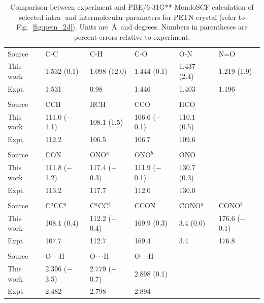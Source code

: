 \documentclass[prb,aps,nobibnotes,twocolumn,doublespace,twocolumngrid,superbib]{revtex4}
\begin{document}
\begin{table}[p]
\caption{Comparison between experiment and PBE/6-31G** MondoSCF calculation
of selected intra- and intermolecular parameters for
PETN crystal (refer to Fig.~\ref{fig:petn_2d}).  
Units are~\AA\ and degrees.  Numbers in parentheses
are percent errors relative to experiment.}
\begin{center}
\begin{tabular}{llllll}
\hline\hline
Source & C-C & C-H & C-O & O-N & N=O  \\
This work & 1.532 (0.1) & 1.098 (12.0) & 1.444 (0.1) &  1.437 (2.4) & 1.219 (1.9) \\
Expt.~\cite{Conant_1979} &  1.531   &   0.98  & 1.446  &  1.403 &   1.196 \\
\hline
\\
Source  &  CCH   &        HCH     &      CCO    &       HCO \\
This work & 111.0 ($-$1.1)  & 108.1  (1.5) &  106.6 ($-$0.1) & 110.1 (0.5) \\
Expt.~\cite{Conant_1979} &  112.2    &  106.5  &  106.7   & 109.6 \\
\hline
\\
Source   &  CON     &       ONO$^a$   &        ONO$^b$     &      ONO \\
This work&  111.8 ($-$1.2) &  117.4 ($-$0.3)&  111.9 ($-$0.1)&  130.7 (0.3)\\
Expt.~\cite{Conant_1979} &    113.2   &       117.7   &       112.0   &       130.0\\
\hline\\
Source &    C$^a$CC$^a$ & C$^a$CC$^b$ & CCON    &       CONO$^a$   &       CONO$^b$ \\
This work &  108.1 (0.4) & 112.2 ($-$0.4)&  169.9 (0.3) &   3.4 (0.0) &     176.6 ($-$0.1) \\
Expt.~\cite{Conant_1979} & 107.7 & 112.7 &   169.4   &       3.4     &       176.8        \\
\hline\\
Source &   O$\cdot\cdot\cdot$H   &       O$\cdot\cdot\cdot$H   &       O$\cdot\cdot\cdot$H\\
This work &  2.396 ($-$3.5) &   2.779 ($-$0.7) & 2.898 (0.1)\\
Expt.~\cite{Conant_1979} &   2.482   &       2.798   &       2.894\\
\hline\hline
\end{tabular}
\end{center}
\label{tab:table2}
\end{table}
\end{document}
